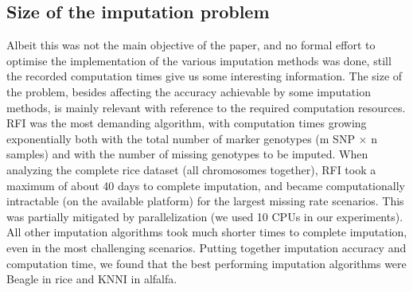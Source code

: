 \subsection{Size of the imputation problem}
\label{sec:size_of_problem}
Albeit this was not the main objective of the paper, and no formal effort to optimise the implementation of the various imputation methods was done, still the recorded computation times give us some interesting information.
The size of the problem, besides affecting the accuracy achievable by some imputation methods, is mainly relevant with reference to the required computation resources. RFI was the most demanding algorithm, with computation times growing exponentially both with the total number of marker genotypes (m SNP $\times$ n samples) and with the number of missing genotypes to be imputed. When analyzing the complete rice dataset (all chromosomes together), RFI took a maximum of about 40 days to complete imputation, and became computationally intractable (on the available platform) for the largest missing rate scenarios. This was partially mitigated by parallelization (we used 10 CPUs in our experiments). All other imputation algorithms took much shorter times to complete imputation, even in the most challenging scenarios. Putting together imputation accuracy and computation time, we found that the best performing imputation algorithms were Beagle in rice and KNNI in alfalfa.
